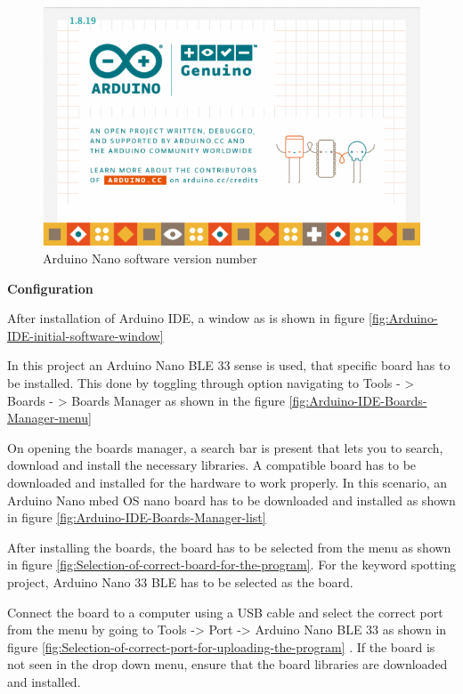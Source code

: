 \begin{figure}[h!]
	\centering
	\includegraphics[width=1.0\textwidth]{Images/Deployment/Arduino-Nano-software-version-number}
	\caption{Arduino Nano software version number} \label{fig:Arduino-Nano-software-version-number}
\end{figure}


\textbf{Configuration}

After installation of Arduino IDE, a window as is shown in figure \ref{fig:Arduino-IDE-initial-software-window}

In this project an Arduino Nano BLE 33 sense is used, that specific board has to be installed. This done by toggling through option navigating to Tools - > Boards - > Boards Manager as shown in the figure \ref{fig:Arduino-IDE-Boards-Manager-menu}

On opening the boards manager, a search bar is present that lets you to search, download and install the necessary libraries. A compatible board has to be downloaded and installed for the hardware to work properly. In this scenario, an Arduino Nano
mbed OS nano board has to be downloaded and installed as shown in figure \ref{fig:Arduino-IDE-Boards-Manager-list}

After installing the boards, the board has to be selected from the menu as shown in figure \ref{fig:Selection-of-correct-board-for-the-program}. For the keyword spotting project, Arduino Nano 33 BLE has to be selected as the board.

Connect the board to a computer using a USB cable and select the correct port from the menu by going to Tools -> Port -> Arduino Nano BLE 33 as shown in figure \ref{fig:Selection-of-correct-port-for-uploading-the-program} .
If the board is not seen in the drop down menu, ensure that the board libraries are downloaded and installed.

